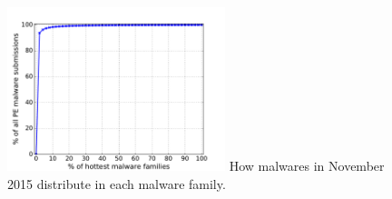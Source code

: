 \begin{figure}[t!]
\begin{center}
\includegraphics[width=2.5in]{figure/cum}
{How malwares in November 2015 distribute in each malware family.}
\end{center}
\end{figure}